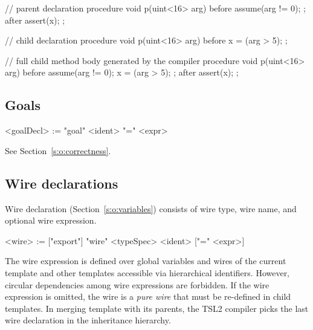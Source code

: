 \documentclass{report}
\newcommand{\tsl}{TSL2 }
\begin{document}
\begin{tsllisting}{}
// parent declaration
procedure void p(uint<16> arg)
before{ 
    assume(arg != 0);
};
after{
    assert(x);
};

// child declaration
procedure void p(uint<16> arg)
before{
    x = (arg > 5);
};

// full child method body generated by the compiler
procedure void p(uint<16> arg)
before{
    assume(arg != 0);
    x = (arg > 5);
};
after{
    assert(x);
};
\end{tsllisting}


\subsection{Goals}

\begin{bnflisting}{}
<goalDecl> := "goal" <ident> "=" <expr>
\end{bnflisting}

See Section~\ref{s:o:correctness}.

\subsection{Wire declarations}

Wire declaration (Section~\ref{s:o:variables}) consists of wire 
type, wire name, and optional wire expression.  

\begin{bnflisting}{}
<wire> := ["export"] "wire" <typeSpec> <ident> ["=" <expr>]
\end{bnflisting}

The wire expression is defined over global variables and wires of 
the current template and other templates accessible via 
hierarchical identifiers.  However, circular dependencies among 
wire expressions are forbidden.  If the wire expression is 
omitted, the wire is a \emph{pure wire} that must be re-defined in 
child templates.  In merging template with its parents, the \tsl 
compiler picks the last wire declaration in the inheritance 
hierarchy.
\end{document}
